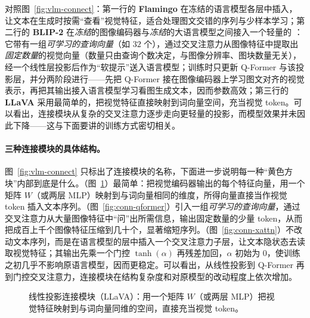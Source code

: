 对照图~\ref{fig:vlm-connect}：第一行的 \textbf{Flamingo}\cite{flamingo} 在冻结的语言模型各层中插入，让文本在生成时按需“查看”视觉特征，适合处理图文交错的序列与少样本学习；第二行的 \textbf{BLIP-2}\cite{blip2} 在\emph{冻结}的图像编码器与\emph{冻结}的大语言模型之间接入一个轻量的 ：它带有一组\emph{可学习的查询向量}（如 $32$ 个），通过交叉注意力从图像特征中提取出\emph{固定数量}的视觉向量（数量只由查询个数决定，与图像分辨率、图块数量无关），经一个线性层投影后作为“软提示”送入语言模型；训练时只更新 Q-Former 与该投影层，并分两阶段进行——先把 Q-Former 接在图像编码器上学习图文对齐的视觉表示，再把其输出接入语言模型学习看图生成文本，因而参数高效；第三行的 \textbf{LLaVA}\cite{llava} 采用最简单的，把视觉特征直接映射到词向量空间，充当视觉 token。可以看出，连接模块从复杂的交叉注意力逐步走向更轻量的投影，而模型效果并未因此下降——这与下面要讲的训练方式密切相关。

\paragraph{三种连接模块的具体结构。}图~\ref{fig:vlm-connect} 只标出了连接模块的名称，下面进一步说明每一种“黄色方块”内部到底是什么。（图~\ref{fig:conn-proj}）最简单：把视觉编码器输出的每个特征向量，用一个矩阵 $W$（或两层 MLP）映射到与词向量相同的维度，所得向量直接当作视觉 token 插入文本序列。（图~\ref{fig:conn-qformer}）引入一组\emph{可学习的查询向量}，通过交叉注意力从大量图像特征中“问”出所需信息，输出固定数量的少量 token，从而把成百上千个图像特征压缩到几十个，显著缩短序列。（图~\ref{fig:conn-xattn}）不改动文本序列，而是在语言模型的层中插入一个交叉注意力子层，让文本隐状态去读取视觉特征；其输出先乘一个门控 $\tanh(\alpha)$ 再残差加回，$\alpha$ 初始为 $0$，使训练之初几乎不影响原语言模型，因而更稳定。可以看出，从线性投影到 Q-Former 再到门控交叉注意力，连接模块在结构复杂度和对原模型的改动程度上依次增加。

\begin{figure}[htbp]
  \centering
  \caption{线性投影连接模块（LLaVA）：用一个矩阵 $W$（或两层 MLP）把视觉特征映射到与词向量同维的空间，直接充当视觉 token。}
  \label{fig:conn-proj}
\end{figure}

